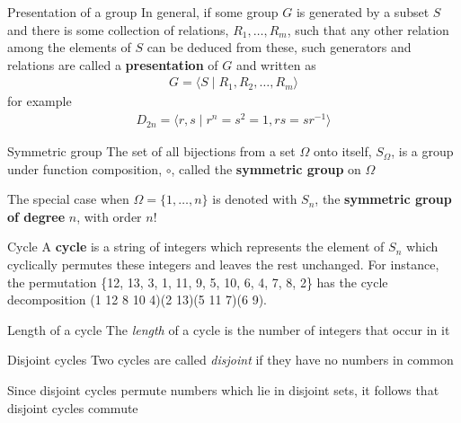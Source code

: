\documentclass[titlepage, 12pt]{book}
\begin{document}
\begin{definition}{Presentation of a group}{}
  In general, if some group $G$ is generated by a subset $S$ and there is
    some collection of relations, $R_1,\dots,R_m$, such that any other relation
    among the elements of $S$ can be deduced from these, such generators and
    relations are called a \textbf{presentation} of $G$ and written as
    \begin{gather*}
      G = \langle S\mid R_1, R_2,\dots, R_m\rangle
    \end{gather*}
    for example
    \begin{gather*}
      D_{2n} = \langle r, s\mid r^n = s^2 = 1, rs = sr^{-1}\rangle
    \end{gather*}
\end{definition}

\begin{definition}{Symmetric group}{}
  The set of all bijections from a set $\Omega$ onto itself, $S_\Omega$,
    is a group under function composition, $\circ$, called the \textbf{symmetric
    group} on $\Omega$

  The special case when $\Omega = \{1,\dots,n\}$ is denoted with $S_n$,
    the \textbf{symmetric group of degree} $n$, with order $n$!
\end{definition}

\begin{definition}{Cycle}{}
  A \textbf{cycle} is a string of integers which represents the element of
    $S_n$ which cyclically permutes these integers and leaves the rest
    unchanged. For instance, the permutation \{12, 13, 3, 1, 11, 9, 5, 10, 6, 4,
    7, 8, 2\} has the cycle decomposition (1 12 8 10 4)(2 13)(5 11 7)(6 9).
\end{definition}

\begin{definition}{Length of a cycle}{}
  The \textit{length} of a cycle is the number of integers that occur in
    it
\end{definition}

\begin{definition}{Disjoint cycles}{}
  Two cycles are called \textit{disjoint} if they have no numbers in
    common
\end{definition}

\begin{proposition}{}{}
Since disjoint cycles permute numbers which lie in disjoint sets, it
follows that disjoint cycles commute
\end{proposition}
\end{document}
